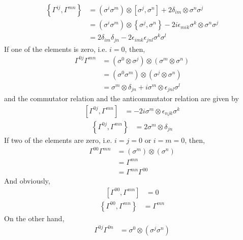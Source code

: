 \begin{align}
    \left\{ \Gamma^{ij}, \Gamma^{mn} \right\} &= (\sigma^{i}\sigma^{m}) \otimes \left[ \sigma^{j}, \sigma^{n} \right] + 2 \delta_{im} \otimes \sigma^{n}\sigma^{j} \\
                                            &= (\sigma^{i}\sigma^{m}) \otimes \left\{ \sigma^{j}, \sigma^{n} \right\} - 2i \epsilon_{mik} \sigma^{k} \otimes \sigma^{n}\sigma^{j} \\
                                            &= 2 \delta_{im}\delta_{jn} - 2\epsilon_{imk}\epsilon_{jnl}\sigma^{k}\sigma^{l}
\end{align}
If one of the elements is zero, i.e. $i=0$, then,
\begin{align}
    \Gamma^{0j}\Gamma^{mn}  &= (\sigma^{0} \otimes \sigma^{j}) \otimes (\sigma^{m} \otimes \sigma^{n}) \nonumber \\ 
                            &= (\sigma^{0} \sigma^{m}) \otimes (\sigma^{j} \otimes \sigma^{n}) \nonumber \\
                            &= \sigma^{m} \otimes \delta_{jn} + i \sigma^{m} \otimes \epsilon_{jnl}\sigma^{l} 
\end{align}
and the commutator relation and the anticommutator relation are given by
\begin{align}
    \left[ \Gamma^{0j}, \Gamma^{mn} \right] &= -2 i  \sigma^{m} \otimes  \epsilon_{njk} \sigma^{k} 
\end{align}
\begin{align}
    \left\{ \Gamma^{0j}, \Gamma^{mn} \right\} &=  2 \sigma^{m} \otimes \delta_{jn} 
\end{align}
If two of the elements are zero, i.e. $i=j=0$ or $i=m=0$, then,
\begin{align}
    \Gamma^{00}\Gamma^{mn}  &= (\sigma^{m}) \otimes (\sigma^{n}) \nonumber \\
                            &= \Gamma^{mn} \nonumber \\
                            &=  \Gamma^{mn}\Gamma^{00} \nonumber
\end{align}
And obviously, 
\begin{align}
    \left[ \Gamma^{00}, \Gamma^{mn} \right] &= 0
\end{align}
\begin{align}
    \left\{ \Gamma^{00}, \Gamma^{mn} \right\} &=  \Gamma^{mn}
\end{align}
On the other hand,
\begin{align}
    \Gamma^{0j}\Gamma^{0n}  &= \sigma^{0} \otimes (\sigma^{j}\sigma^{n}) \nonumber
\end{align}

